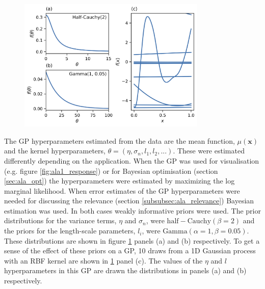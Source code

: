\begin{figure}
    \centering
    \includegraphics[width=0.8\textwidth]{chapters/msm_optimization/figures/prior_functions.png}
    \label{fig:priors}
\end{figure}

The GP hyperparameters estimated from the data are the mean function, $\mu(\mathbf{x})$ and the kernel hyperparameters, $\theta = (\eta, \sigma_{n}, l_{1}, l_{2}, ...)$. These were estimated differently depending on the application. When the GP was used for visualisation (e.g. figure \ref{fig:ala1_response}) or for Bayesian optimisation (section \ref{sec:ala_opt}) the hyperparameters were estimated by maximizing the log marginal likelihood. When error estimates of the GP hyperparameters were needed for discussing the relevance (section \ref{subsubsec:ala_relevance}) Bayesian estimation was used. In both cases  weakly informative priors were used. The prior distributions for the variance terms, $\eta$ and $\sigma_{n}$, were $\mathrm{half-Cauchy}(\beta=2)$ and the priors for the length-scale parameters, $l_{i}$, were $\mathrm{Gamma}(\alpha=1, \beta=0.05)$. These distributions are shown in figure \ref{fig:priors} panels (a) and (b) respectively.  To get a sense of the effect of these priors on a GP, 10 draws from a 1D Gaussian process with an RBF kernel are shown in  \ref{fig:priors} panel (c). The values of the $\eta$ and $l$ hyperparameters in this GP are drawn the distributions in panels (a) and (b) respectively.  

